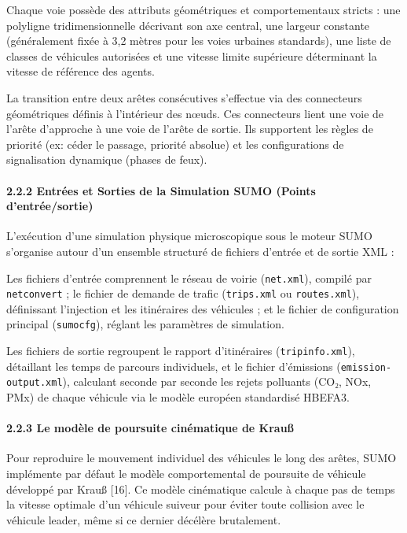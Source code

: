 \documentclass[10pt, a4paper]{article}
\begin{document}
Chaque voie possède des attributs géométriques et comportementaux
stricts : une polyligne tridimensionnelle décrivant son axe central, une
largeur constante (généralement fixée à 3,2 mètres pour les voies
urbaines standards), une liste de classes de véhicules autorisées et une
vitesse limite supérieure déterminant la vitesse de référence des
agents.

La transition entre deux arêtes consécutives s'effectue via des
connecteurs géométriques définis à l'intérieur des nœuds. Ces
connecteurs lient une voie de l'arête d'approche à une voie de l'arête
de sortie. Ils supportent les règles de priorité (ex: céder le passage,
priorité absolue) et les configurations de signalisation dynamique
(phases de feux).

\paragraph{2.2.2 Entrées et Sorties de la Simulation SUMO (Points
d'entrée/sortie)}\label{entruxe9es-et-sorties-de-la-simulation-sumo-points-dentruxe9esortie}

L'exécution d'une simulation physique microscopique sous le moteur SUMO
s'organise autour d'un ensemble structuré de fichiers d'entrée et de
sortie XML :

Les fichiers d'entrée comprennent le réseau de voirie
(\texttt{net.xml}), compilé par \texttt{netconvert} ; le fichier de
demande de trafic (\texttt{trips.xml} ou \texttt{routes.xml}),
définissant l'injection et les itinéraires des véhicules ; et le fichier
de configuration principal (\texttt{sumocfg}), réglant les paramètres de
simulation.

Les fichiers de sortie regroupent le rapport d'itinéraires
(\texttt{tripinfo.xml}), détaillant les temps de parcours individuels,
et le fichier d'émissions (\texttt{emission-output.xml}), calculant
seconde par seconde les rejets polluants (CO₂, NOx, PMx) de chaque
véhicule via le modèle européen standardisé HBEFA3.

\paragraph{2.2.3 Le modèle de poursuite cinématique de
Krauß}\label{le-moduxe8le-de-poursuite-cinuxe9matique-de-krauuxdf}

Pour reproduire le mouvement individuel des véhicules le long des
arêtes, SUMO implémente par défaut le modèle comportemental de poursuite
de véhicule développé par Krauß {[}16{]}. Ce modèle cinématique calcule
à chaque pas de temps la vitesse optimale d'un véhicule suiveur pour
éviter toute collision avec le véhicule leader, même si ce dernier
décélère brutalement.
\end{document}
